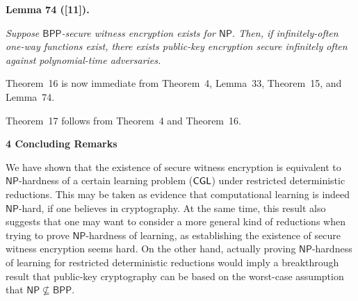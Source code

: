 

\par\medskip\noindent\textbf{
\textbf{Lemma 74}\textbf{ }([11])\textbf{.}
}\par



\emph{Suppose ${\mathsf{BPP}}$-secure witness encryption exists for ${\mathsf{NP}}$. Then, if infinitely-often one-way functions exist, there exists public-key encryption secure infinitely often against polynomial-time adversaries.}\par






Theorem 16 is now immediate from Theorem 4, Lemma 33, Theorem 15, and Lemma 74.\par




Theorem 17 follows from Theorem 4 and Theorem 16.\par







\par\medskip\noindent\textbf{
4 Concluding Remarks}\par




We have shown that the existence of secure witness encryption is equivalent to ${\mathsf{NP}}$-hardness of a certain learning problem (${\sf CGL}$) under restricted deterministic reductions. This may be taken as evidence that computational learning is indeed ${\mathsf{NP}}$-hard, if one believes in cryptography. At the same time, this result also suggests that one may want to consider a more general kind of reductions when trying to prove ${\mathsf{NP}}$-hardness of learning, as establishing the existence of secure witness encryption seems hard. On the other hand, actually proving ${\mathsf{NP}}$-hardness of learning for restricted deterministic reductions would imply a breakthrough result that public-key cryptography can be based on the worst-case assumption that ${\mathsf{NP}}\not\subseteq{\mathsf{BPP}}$.\par




